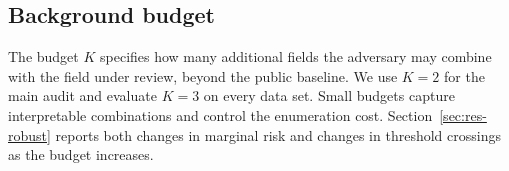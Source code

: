 \subsection{Background budget}
The budget $K$ specifies how many additional fields the adversary may combine with the field under review, beyond the public baseline. We use $K=2$ for the main audit and evaluate $K=3$ on every data set. Small budgets capture interpretable combinations and control the enumeration cost. Section~\ref{sec:res-robust} reports both changes in marginal risk and changes in threshold crossings as the budget increases.
